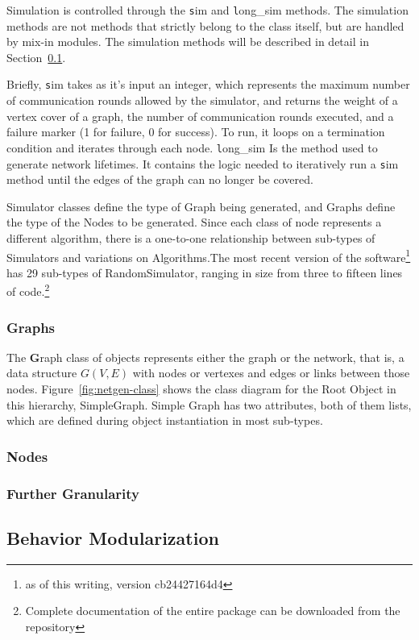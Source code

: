 Simulation is controlled through the {\texttt sim} and {\texttt long\_sim} methods. The simulation methods are not methods that strictly belong to the class itself, but are handled by mix-in modules. The simulation methods will be described in detail in Section~\ref{sec:sim-modules}. 

Briefly, {\texttt sim} takes as it's input an integer, which represents the maximum number of communication rounds allowed by the simulator, and returns the weight of a vertex cover of a graph, the number of communication rounds executed, and a failure marker (1 for failure, 0 for success). To run, it loops on a termination condition and iterates through each node. {\texttt long\_sim} Is the method used to generate network lifetimes. It contains the logic needed to iteratively run a {\texttt sim} method until the edges of the graph can no longer be covered. 

Simulator classes define the type of Graph being generated, and Graphs define the type of the Nodes to be generated. Since each class of node represents a different algorithm, there is a one-to-one relationship between sub-types of Simulators and variations on Algorithms.The most recent version of the software\footnote{as of this writing, version cb24427164d4} has 29 sub-types of RandomSimulator, ranging in size from three to fifteen lines of code.\footnote{Complete documentation of the entire package can be downloaded from the repository}

\subsubsection{Graphs}

The {\textbf Graph} class of objects represents either the graph or the network, that is, a data structure $G(V,E)$ with nodes or vertexes and edges or links between those nodes. Figure~\ref{fig:netgen-class} shows the class diagram for the Root Object in this hierarchy, {\textt SimpleGraph}. Simple Graph has two attributes, both of them lists, which are defined during object instantiation in most sub-types. 

\subsubsection{Nodes}
\subsubsection{Further Granularity}
\subsection{Behavior Modularization}
\label{sec:sim-modules}
